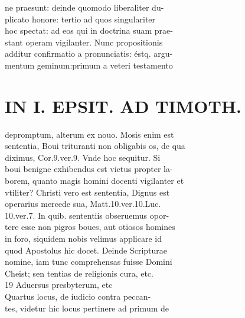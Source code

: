 \documentclass{article}
\begin{document}
\begin{pages}
                ne praesunt: deinde quomodo liberaliter du- \\
                plicato honore: tertio ad quos singulariter \\
                hoc spectat: ad eos qui in doctrina suam prae- \\
                stant operam vigilanter. Nunc propositionis \\
                additur confirmatio a pronunciatis: éstq. argu- \\
                mentum geminum:primum a veteri testamento \\
                
\section*{IN I. EPSIT. AD TIMOTH. \\
                }
depromptum, alterum ex nouo. Mosis enim est \\
                sententia, Boui trituranti non obligabis os, de qua \\
                diximus, Cor.9.ver.9. Vnde hoc sequitur. Si \\
                boui benigne exhibendus est victus propter la- \\
                borem, quanto magis homini docenti vigilanter et \\
                vtiliter? Christi vero est sententia, Dignus est \\
                operarius mercede sua, Matt.10.ver.10.Luc. \\
                10.ver.7. In quib. sententiis obseruemus opor- \\
                tere esse non pigros boues, aut otiosos homines \\
                in foro, siquidem nobis velimus applicare id \\
                quod Apostolus hic docet. Deinde Scripturae \\
                nomine, iam tunc comprehensas fuisse Domini \\
                Cheist; sen tentias de religionis cura, etc. \\
                19 Aduersus presbyterum, etc \\
                Quartus locus, de iudicio contra peccan- \\
                tes, videtur hic locus pertinere ad primum de \\

\end{pages}
\end{document}
